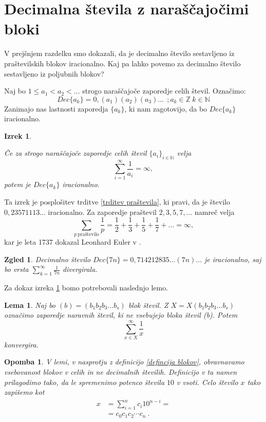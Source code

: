 \documentclass[a4paper,12pt]{article}
\def\N{\mathbb{N}} %
\def\Z{\mathbb{Z}} %
\newtheorem{izrek}{Izrek}
\newtheorem{lema}{Lema}
\newtheorem{opomba}{Opomba}
\newtheorem{zgled}{Zgled}
\begin{document}

\section{Decimalna števila z naraščajočimi bloki}

V prejšnjem razdelku smo dokazali, da je decimalno število sestavljeno iz praštevilskih
blokov iracionalno. Kaj pa lahko povemo za decimalno število sestavljeno iz poljubnih blokov?

Naj bo $1 \leq a_1 < a_2 < \dots $ strogo naraščajoče zaporedje celih števil. 
Označimo: \[Dec\{a_k\} = 0,(a_1)(a_2)(a_3)... \  \ ;  a_k \in \Z \ k \in \N \]
Zanimajo nas lastnosti zaporedja $\{a_k\}$, ki nam zagotovijo, da bo $Dec\{a_k\}$ iracionalno.


\begin{izrek}\label{irac1}
    
    Če za strogo naraščajoče zaporedje celih števil $\{a_i\}_{i \in \N}$ velja 
    \[ \sum_{i=1}^{\infty} \frac{1}{a_i} = \infty ,\]
    potem je $Dec\{a_k\}$ iracionalno.
\end{izrek}

Ta izrek je posplošitev trditve \ref{trditev praštevila}, ki pravi, da je število $0,23571113 \dots$
iracionalno. Za zaporedje praštevil $2, 3, 5, 7, \dots$ namreč velja
\[
    \sum_{p \ \text{praštevilo}}\frac{1}{p} = \frac{1}{2} + \frac{1}{3} + \frac{1}{5} + \frac{1}{7} + \dots = \infty ,\]
kar je leta 1737 dokazal Leonhard Euler v \cite{Eul}.

\begin{zgled}
    Decimalno število $Dec\{7n\} = 0,714212835\dots (7n) \dots$ je iracionalno, saj
    bo vrsta $\sum_{k=1}^{\infty}\frac{1}{7n} $ divergirala.
\end{zgled}

Za dokaz izreka \ref{irac1} bomo potrebovali naslednjo lemo.

\begin{lema}
    Naj bo $(b) = (b_1b_2b_3 \dots b_s)$ blok števil. Z $X = X(b_1b_2b_3 \dots b_s)$ označimo
    zaporedje naravnih števil, ki ne vsebujejo bloka števil (b). Potem 
    \[ \sum_{x \in X}^{\infty} \frac{1}{x}\] konvergira.
\end{lema}

\begin{opomba}
    \label{lema bloki}
    V lemi, v nasprotju z definicijo \ref{defincija blokov}, obravnavamo vsebovanost blokov v celih
    in ne decimalnih številih. Definicijo v ta namen prilagodimo tako, da le spremenimo potenco števila
    $10$ v vsoti. Celo število $x$ tako zapišemo kot 
    \[ 
        \begin{split}
            x & = \sum^n_{i=1} c_i 10^{n-i} = \\
            & = c_0c_1c_2 \cdots c_n \ .
        \end{split} \]
\end{opomba}
\end{document}
